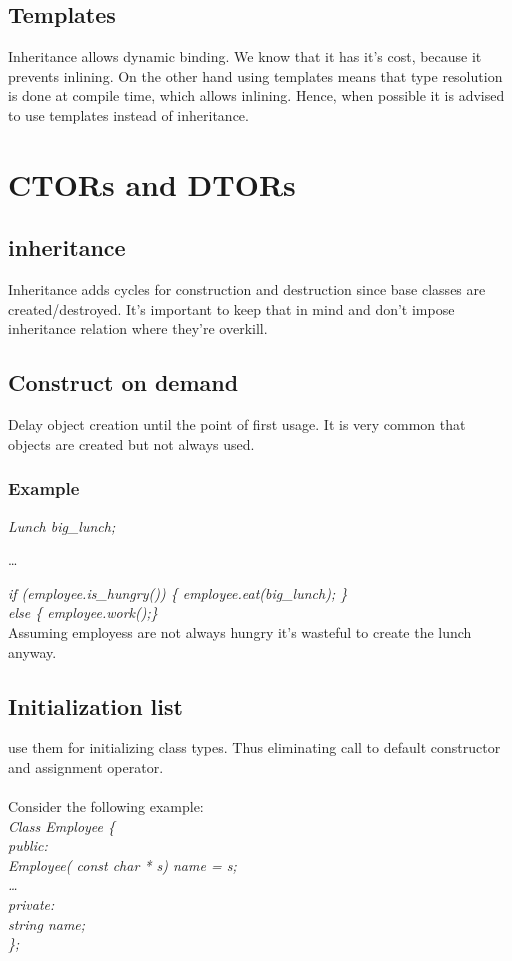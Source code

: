 \documentclass{article}
\begin{document}
 \subsection {Templates}
 Inheritance allows dynamic binding. We know that it has it's cost, because it prevents inlining.
 On the other hand using templates means that type resolution is done at compile time, which allows inlining.
 Hence, when possible it is advised to use templates instead of inheritance.

\section {CTORs and DTORs}
 \subsection {inheritance}
 Inheritance adds cycles for construction and destruction since base classes are created/destroyed.
 It's important to keep that in mind and don't impose inheritance relation where they're overkill.

 \subsection{Construct on demand}
 Delay object creation until the point of first usage. It is very common that objects are created but not always used.

 \subsubsection{Example}
 
 \emph{Lunch big\_lunch; }
 
 \ldots

 \emph{ if (employee.is\_hungry()) \{ employee.eat(big\_lunch); \}  }\\
 \emph{ else \{ employee.work();\} } \\
  
 Assuming employess are not always hungry it's wasteful to create the lunch anyway.
 
 \subsection{Initialization list}
 use them for initializing class types. Thus eliminating call to default constructor and assignment operator.

 \paragraph{}
 Consider the following example:\\
 \emph{
 Class Employee \{\\
%  
 public:\\
%
 Employee( const char * s) { name = s;}\\
% 
 \ldots\\
%
 private:\\
 string name;\\
 \};\\
 }
\end{document}
